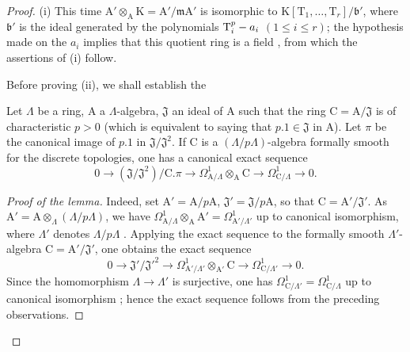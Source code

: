 \begin{proof}
(i) This time $\mathrm{A}'\otimes_\mathrm{A}\mathrm{K}=\mathrm{A}'/\mathfrak{m}\mathrm{A}'$ is isomorphic to $\mathrm{K}[\mathrm{T}_1,\ldots,\mathrm{T}_r]/\mathfrak{b}'$, where $\mathfrak{b}'$ is the ideal generated by the polynomials $\mathrm{T}_i^p- a_i$ $(1\leq i\leq r)$; the hypothesis made on the $a_i$ implies that this quotient ring is a field , from which the assertions of (i) follow.

Before proving (ii), we shall establish the

\begin{lemma}[22.4.4.2]
\label{0.22.4.4.2}
Let $\Lambda$ be a ring, $\mathrm{A}$ a $\Lambda$-algebra, $\mathfrak{J}$ an ideal of $\mathrm{A}$ such that the ring $\mathrm{C}=\mathrm{A}/\mathfrak{J}$ is of characteristic $p>0$ (which is equivalent to saying that $p.1\in\mathfrak{J}$ in $\mathrm{A}$).
Let $\pi$ be the canonical image of $p.1$ in $\mathfrak{J}/\mathfrak{J}^2$.
If $\mathrm{C}$ is a $(\Lambda/p\Lambda)$-algebra formally smooth for the discrete topologies, one has a canonical exact sequence
\begin{equation}
\label{0.22.4.4.3}
  0\longrightarrow(\mathfrak{J}/\mathfrak{J}^2)/\mathrm{C}.\pi
  \longrightarrow\Omega^1_{\mathrm{A}/\Lambda}\otimes_\mathrm{A}\mathrm{C}
  \longrightarrow\Omega^1_{\mathrm{C}/\Lambda}\longrightarrow0.
  \tag{22.4.4.3}
\end{equation}
\end{lemma}

\begin{proof}[Proof of the lemma]
Indeed, set $\mathrm{A}'=\mathrm{A}/p\mathrm{A}$, $\mathfrak{J}'=\mathfrak{J}/p\mathrm{A}$, so that $\mathrm{C}=\mathrm{A}'/\mathfrak{J}'$.
As $\mathrm{A}'=\mathrm{A}\otimes_\Lambda(\Lambda/p\Lambda)$, we have $\Omega^1_{\mathrm{A}/\Lambda}\otimes_\mathrm{A}\mathrm{A}'=\Omega^1_{\mathrm{A}'/\Lambda'}$ up to canonical isomorphism, where $\Lambda'$ denotes $\Lambda/p\Lambda$ .
Applying the exact sequence  to the formally smooth $\Lambda'$-algebra $\mathrm{C}=\mathrm{A}'/\mathfrak{J}'$, one obtains the exact sequence
\[
  0\longrightarrow\mathfrak{J}'/\mathfrak{J}'^2
  \longrightarrow\Omega^1_{\mathrm{A}'/\Lambda'}\otimes_{\mathrm{A}'}\mathrm{C}
  \longrightarrow\Omega^1_{\mathrm{C}/\Lambda'}\longrightarrow0.
\]
Since the homomorphism $\Lambda\to\Lambda'$ is surjective, one has $\Omega^1_{\mathrm{C}/\Lambda'}=\Omega^1_{\mathrm{C}/\Lambda}$ up to canonical isomorphism ; hence the exact sequence  follows from the preceding observations.
\end{proof}


\end{proof}
